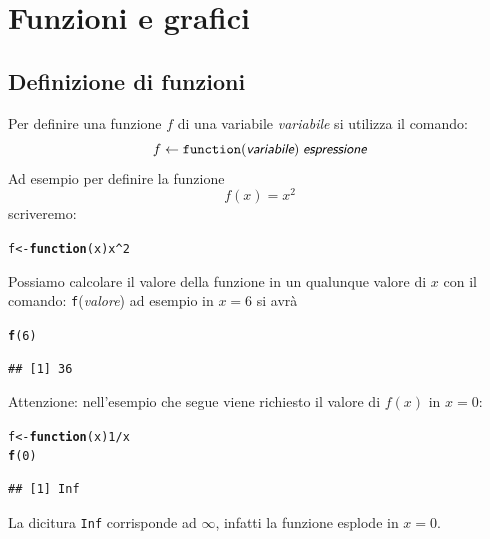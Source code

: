 \documentclass[onecolumn,11pt]{book}\usepackage[]{graphicx}\usepackage[]{color}
\makeatletter
\newcommand{\hlnum}[1]{\textcolor[rgb]{0.686,0.059,0.569}{#1}}%
\newcommand{\hlopt}[1]{\textcolor[rgb]{0,0,0}{#1}}%
\newcommand{\hlstd}[1]{\textcolor[rgb]{0.345,0.345,0.345}{#1}}%
\newcommand{\hlkwa}[1]{\textcolor[rgb]{0.161,0.373,0.58}{\textbf{#1}}}%
\newcommand{\hlkwb}[1]{\textcolor[rgb]{0.69,0.353,0.396}{#1}}%
\newcommand{\hlkwc}[1]{\textcolor[rgb]{0.333,0.667,0.333}{#1}}%
\newcommand{\hlkwd}[1]{\textcolor[rgb]{0.737,0.353,0.396}{\textbf{#1}}}%
\newenvironment{kframe}{%
 \def\at@end@of@kframe{}%
 \ifinner\ifhmode%
  \def\at@end@of@kframe{\end{minipage}}%
  \begin{minipage}{\columnwidth}%
 \fi\fi%
 \def\FrameCommand##1{\hskip\@totalleftmargin \hskip-\fboxsep
 \colorbox{shadecolor}{##1}\hskip-\fboxsep
     \hskip-\linewidth \hskip-\@totalleftmargin \hskip\columnwidth}%
 \MakeFramed {\advance\hsize-\width
   \@totalleftmargin\z@ \linewidth\hsize
   \@setminipage}}%
 {\par\unskip\endMakeFramed%
 \at@end@of@kframe}
\newenvironment{knitrout}{}{} %
\newcommand{\varia}[1]{\textsl{\textsf{#1}}}
\makeatother
\begin{document}
\section{Funzioni e grafici}
\subsection{Definizione di funzioni}
Per definire una funzione $f$ di una variabile \varia{variabile}  si utilizza il comando:
$$f\leftarrow \texttt{function}(\varia{variabile})\; \varia{espressione}$$
Ad esempio per definire la funzione $$f(x)=x^2$$ scriveremo:
\begin{knitrout}
\color{fgcolor}\begin{kframe}
\begin{alltt}
\hlstd{f}\hlkwb{<-}\hlkwa{function}\hlstd{(}\hlkwc{x}\hlstd{) x}\hlopt{^}\hlnum{2}
\end{alltt}
\end{kframe}
\end{knitrout}
Possiamo calcolare il valore della funzione in un qualunque valore di $x$  con il comando:
\texttt{f}(\varia{valore})
ad esempio in $x=6$ si avr\`a
\begin{knitrout}
\color{fgcolor}\begin{kframe}
\begin{alltt}
\hlkwd{f}\hlstd{(}\hlnum{6}\hlstd{)}
\end{alltt}
\begin{verbatim}
## [1] 36
\end{verbatim}
\end{kframe}
\end{knitrout}
Attenzione: nell'esempio che segue viene richiesto il valore di $f(x)$ in $x=0$:
\begin{knitrout}
\color{fgcolor}\begin{kframe}
\begin{alltt}
\hlstd{f}\hlkwb{<-}\hlkwa{function}\hlstd{(}\hlkwc{x}\hlstd{)}  \hlnum{1}\hlopt{/}\hlstd{x}
\hlkwd{f}\hlstd{(}\hlnum{0}\hlstd{)}
\end{alltt}
\begin{verbatim}
## [1] Inf
\end{verbatim}
\end{kframe}
\end{knitrout}
La dicitura \texttt{Inf} corrisponde ad $\infty$, infatti la funzione esplode in $x=0$.
\end{document}
